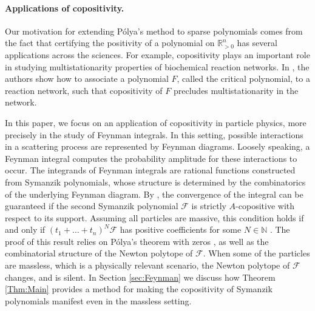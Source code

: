 \documentclass[a4paper,11pt]{amsart}
\theoremstyle{definition}
\newcommand{\NN}{\mathbb{N}}
\newcommand{\RR}{\mathbb{R}}
\begin{document}
\medskip

\paragraph{\textbf{Applications of copositivity.}} Our motivation for extending Pólya’s method to sparse polynomials comes from the fact that certifying the positivity of a polynomial on $\RR^n_{>0}$ has several applications across the sciences.
For example, copositivity plays an important role in studying multistationarity properties of biochemical reaction networks. In \cite[Corollary 1]{ConradiFeliuWiuf}, the authors show how to associate a polynomial $F$, called the critical polynomial, to a reaction network, such that copositivity of $F$ precludes multistationarity in the network.

In this paper, we focus on an application of copositivity in particle physics, more precisely in the study of Feynman integrals. In this setting, possible interactions in a scattering process are represented by Feynman diagrams. Loosely speaking, a Feynman integral computes the probability amplitude for these interactions to occur. The integrands of Feynman integrals are rational functions constructed from Symanzik polynomials, whose structure is determined by the combinatorics of the underlying Feynman diagram. 
By \cite[Theorem 3]{Borinsky}, the convergence of the integral can be guaranteed if the second Symanzik polynomial $\mathcal{F}$ is strictly $A$-copositive with respect to its support.
Assuming all particles are massive, this condition holds if and only if $(t_1 + \dots + t_n)^N\mathcal{F}$ has positive coefficients for some $N \in \NN$ \cite[Theorem 6.1]{SturmfelsTelek}.
The proof of this result relies on Pólya’s theorem with zeros \cite[Theorem 2]{CastlePowersReznick}, as well as the combinatorial structure of the Newton polytope of $\mathcal{F}$.
When some of the particles are massless, which is a physically relevant scenario, the Newton polytope of $\mathcal{F}$ changes, and \cite[Theorem 6.1]{SturmfelsTelek} is silent. In Section \ref{sec:Feynman} we discuss how Theorem~ \ref{Thm:Main} provides a method for making the copositivity of Symanzik polynomials manifest even in the massless setting. 

\medskip
\end{document}
